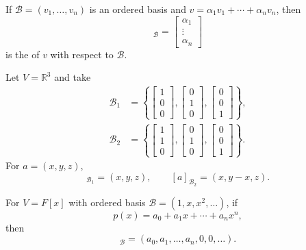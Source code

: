 If $\mathcal B=(v_1,\ldots,v_n)$ is an ordered basis and $v=\alpha_1v_1+\cdots+\alpha_nv_n$, then
\begin{equation*}
[v]_{\mathcal B}=\begin{bmatrix}\alpha_1\\\vdots\\\alpha_n\end{bmatrix}
\end{equation*}
is the  of $v$ with respect to $\mathcal B$.

\begin{Example}
Let $V=\mathbb R^3$ and take
\begin{align*}
\mathcal B_1&=\left\{\begin{bmatrix}1\\0\\0\end{bmatrix},
\begin{bmatrix}0\\1\\0\end{bmatrix},
\begin{bmatrix}0\\0\\1\end{bmatrix}\right\},\\
\mathcal B_2&=\left\{\begin{bmatrix}1\\1\\0\end{bmatrix},
\begin{bmatrix}0\\1\\0\end{bmatrix},
\begin{bmatrix}0\\0\\1\end{bmatrix}\right\}.
\end{align*}
For $a=(x,y,z)$,
\begin{equation*}
[a]_{\mathcal B_1}=(x,y,z),\qquad
[a]_{\mathcal B_2}=(x,y-x,z).
\end{equation*}
\end{Example}

\begin{Example}
For $V=F[x]$ with ordered basis $\mathcal B=(1,x,x^2,\ldots)$, if
\begin{equation*}
p(x)=a_0+a_1x+\cdots+a_nx^n,
\end{equation*}
then
\begin{equation*}
[p]_{\mathcal B}=(a_0,a_1,\ldots,a_n,0,0,\ldots).
\end{equation*}
\end{Example}

